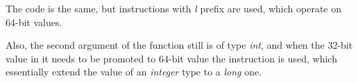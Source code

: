 The code is the same, but instructions with \emph{l} prefix are used, which operate 
on 64-bit values.

Also, the second argument of the function still is of type \emph{int}, and when the 32-bit value in it 
needs to be promoted to 64-bit value the  instruction is used, 
which essentially extend the value of an \emph{integer} type to a \emph{long} one.

